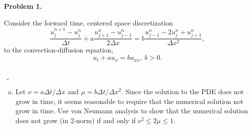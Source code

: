 \documentclass[12pt]{article}
\newenvironment{myprob}[1]
    {%
    \noindent{\Huge$\ulcorner$}\textbf{#1.}\begin{em}
    }
    { 
    \end{em} \\ \hphantom{l} \hfill {\Huge$\lrcorner$} }
\begin{document}
\rhead{\today}

{\let\newpage\relax} 


\begin{myprob}{Problem 1}
Consider the forward time, centered space discretization
$$\dfrac{u_j^{n+1}-u_j^n}{\Delta t} + a \dfrac{u_{j+1}^n - u_{j-1}^n}{2\Delta x} = b \dfrac{u_{j-1}^n - 2u_j^n + u_{j+1}^n}{\Delta x^2},$$
to the convection-diffusion equation,
$$u_t + au_x = bu_{xx}, \ b>0 .$$
\end{myprob}
\begin{enumerate}[(a)]
\item Let $\nu = a\Delta t/ \Delta x$ and $\mu = b \Delta t/\Delta x^2$.  Since the solution to the PDE does not grow in time, it seems reasonable to require that the numerical solution not grow in time.  Use von Neumann analysis to show that the numerical solution does not grow (in 2-norm) if and only if $\nu^2 \leq 2\mu \leq 1.$


\end{enumerate}
\end{document}
